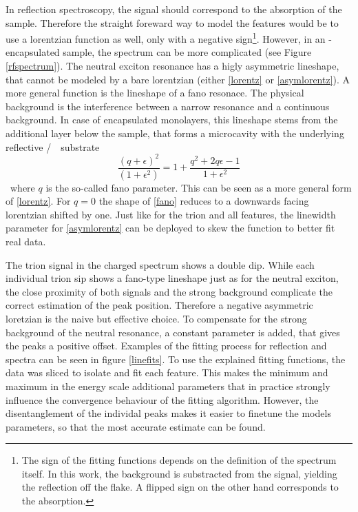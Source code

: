 In reflection spectroscopy, the signal should correspond to the absorption of the sample. Therefore the straight foreward way to model the features would be to use a lorentzian function as well, only with a negative sign\footnote{The sign of the fitting functions depends on the definition of the spectrum itself. In this work, the background is substracted from the signal, yielding the reflection off the flake. A flipped sign on the other hand corresponds to the absorption.}. However, in an \hbn-encapsulated sample, the spectrum can be more complicated (see Figure \ref{rfspectrum}). The neutral exciton resonance has a higly asymmetric lineshape, that cannot be modeled by a bare lorentzian (either \eqref{lorentz} or \eqref{asymlorentz}). A more general function is the lineshape of a fano resonace. The physical background is the interference between a narrow resonance and a continuous background\cite{fano_effects_1961}. In case of encapsulated \tmdg monolayers, this lineshape stems from the additional \hbng layer below the sample, that forms a microcavity with the underlying reflective \si/\sio substrate\cite{scuri_large_2018}.
\begin{equation}
\frac{(q+\epsilon)^2}{(1+\epsilon^2)} = 1 + \frac{q^2+2q\epsilon-1}{1+\epsilon^2}\label{fano}
\end{equation}
where $q$ is the so-called fano parameter. This can be seen as a more general form of \eqref{lorentz}. For $q=0$ the shape of \eqref{fano} reduces to a downwards facing lorentzian shifted by one. Just like for the trion and all \pl features, the linewidth parameter for \eqref{asymlorentz} can be deployed to skew the function to better fit real data.

The trion signal in the charged spectrum shows a double dip. While each individual trion sip shows a fano-type lineshape just as for the neutral exciton, the close proximity of both signals and the strong background complicate the correct estimation of the peak position. Therefore a negative asymmetric loretzian is the naive but effective choice. To compensate for the strong background of the neutral resonance, a constant parameter is added, that gives the peaks a positive offset. 
Examples of the fitting process for reflection and \pl spectra can be seen in figure \ref{linefits}. To use the explained fitting functions, the data was sliced to isolate and fit each feature. This makes the minimum and maximum in the energy scale additional parameters that in practice strongly influence the convergence behaviour of the fitting algorithm. However, the disentanglement of the individal peaks makes it easier to finetune the models parameters, so that the most accurate estimate can be found.

